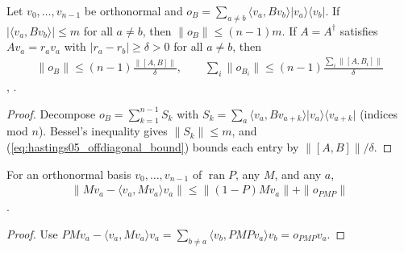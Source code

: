 \begin{lemma}
    \label{thm:hastings05_simple_spectrum_basis}
    \leanok
    Let $v_0,\dots,v_{n-1}$ be orthonormal and
    $o_B=\sum_{a\ne b}\langle v_a,Bv_b\rangle\lvert v_a\rangle\langle v_b\rvert$.
    If $|\langle v_a,Bv_b\rangle|\le m$ for all $a\ne b$, then
    $\|o_B\|\le(n-1)m$. If $A=A^\dagger$ satisfies $Av_a=r_av_a$ with
    $|r_a-r_b|\ge\delta>0$ for all $a\ne b$, then
    \begin{align}
        \|o_B\|\le(n-1)\frac{\|[A,B]\|}{\delta},
        \qquad
        \sum_i\|o_{B_i}\|\le(n-1)\frac{\sum_i\|[A,B_i]\|}{\delta}
        \label{eq:hastings05_simple_spectrum_basis}
    \end{align}
    \cite[lines 1678--1705]{Hastings2006Solving},
    \cite{gap:hastings05_two_dim_ground_basis}.
\end{lemma}
\begin{proof}\leanok
    Decompose $o_B=\sum_{k=1}^{n-1}S_k$ with
    $S_k=\sum_a\langle v_a,Bv_{a+k}\rangle\lvert v_a\rangle\langle v_{a+k}\rvert$
    (indices mod $n$). Bessel's inequality gives $\|S_k\|\le m$, and
    (\ref{eq:hastings05_offdiagonal_bound}) bounds each entry by
    $\|[A,B]\|/\delta$.
\end{proof}

\begin{lemma}
    \label{thm:hastings05_low_up_to_offdiagonal_family}
    \leanok
    For an orthonormal basis $v_0,\dots,v_{n-1}$ of $\operatorname{ran}P$, any
    $M$, and any $a$,
    \begin{align}
        \|Mv_a-\langle v_a,Mv_a\rangle v_a\|\le\|(1-P)Mv_a\|+\|o_{PMP}\|
        \label{eq:hastings05_low_up_to_offdiagonal_family}
    \end{align}
    \cite[eq.~(low), lines 476--491]{Hastings2006Solving}.
\end{lemma}
\begin{proof}\leanok
    Use $PMv_a-\langle v_a,Mv_a\rangle v_a
        =\sum_{b\ne a}\langle v_b,PMPv_a\rangle v_b=o_{PMP}v_a$.
\end{proof}

